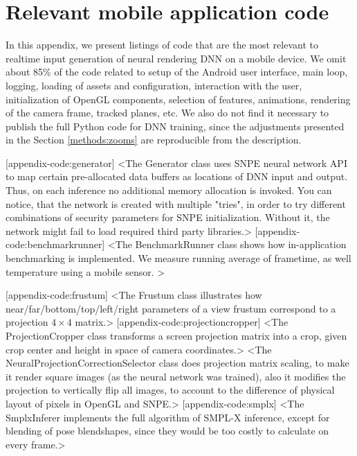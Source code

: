 \chapter{Relevant mobile application code}
\label{appendix-code}

In this appendix, we present listings of code that are the most relevant to realtime input generation of neural rendering DNN on a mobile device. We omit about 85\% of the code related to setup of the Android user interface, main loop, logging, loading of assets and configuration, interaction with the user, initialization of OpenGL components, selection of features, animations, rendering of the camera frame, tracked planes, etc. We also do not find it necessary to publish the full Python code for DNN training, since the adjustments presented in the Section \ref{methods:zooms} are reproducible from the description.

[appendix-code:generator]
<The Generator class uses SNPE neural network API to map certain pre-allocated data buffers as locations of DNN input and output. Thus, on each inference no additional memory allocation is invoked. You can notice, that the network is created with multiple "tries", in order to try different combinations of security parameters for SNPE initialization. Without it, the network might fail to load required third party libraries.>
[appendix-code:benchmarkrunner]
<The BenchmarkRunner class shows how in-application benchmarking is implemented. We measure running average of frametime, as well temperature using a mobile sensor. >


[appendix-code:frustum]
<The Frustum class illustrates how near/far/bottom/top/left/right parameters of a view frustum correspond to a projection $4\times4$ matrix.>
[appendix-code:projectioncropper]
<The ProjectionCropper class transforms a screen projection matrix into a crop, given crop center and height in space of camera coordinates.>
<The NeuralProjectionCorrectionSelector class does projection matrix scaling, to make it render square images (as the neural network was trained), also it modifies the projection to vertically flip all images, to account to the difference of physical layout of pixels in OpenGL and SNPE.>
[appendix-code:smplx]
<The SmplxInferer implements the full algorithm of SMPL-X inference, except for blending of pose blendshapes, since they would be too costly to calculate on every frame.>

